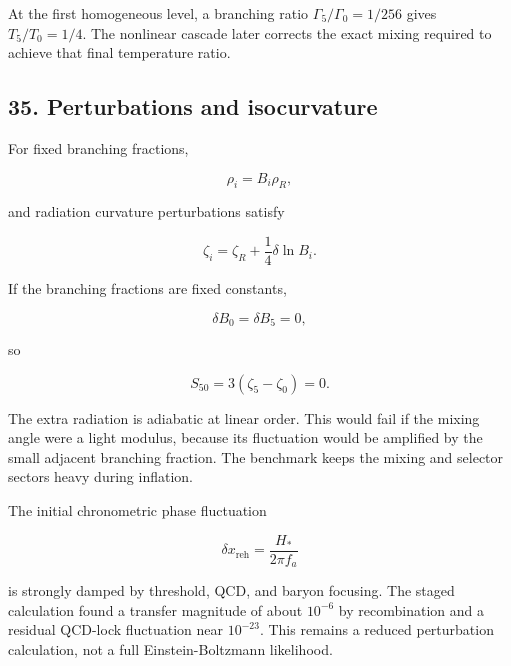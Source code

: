 \documentclass[
]{article}
\begin{document}
At the first homogeneous level, a branching ratio
\(\Gamma_5/\Gamma_0=1/256\) gives \(T_5/T_0=1/4\). The nonlinear cascade
later corrects the exact mixing required to achieve that final
temperature ratio.

\hypertarget{perturbations-and-isocurvature}{%
\subsection{35. Perturbations and
isocurvature}\label{perturbations-and-isocurvature}}

For fixed branching fractions,

\[
\rho_i=B_i\rho_R,
\]

and radiation curvature perturbations satisfy

\[
\zeta_i=\zeta_R+\frac14\delta\ln B_i.
\]

If the branching fractions are fixed constants,

\[
\delta B_0=\delta B_5=0,
\]

so

\[
S_{50}=3(\zeta_5-\zeta_0)=0.
\]

The extra radiation is adiabatic at linear order. This would fail if the
mixing angle were a light modulus, because its fluctuation would be
amplified by the small adjacent branching fraction. The benchmark keeps
the mixing and selector sectors heavy during inflation.

The initial chronometric phase fluctuation

\[
\delta x_{\mathrm{reh}}=\frac{H_*}{2\pi f_a}
\]

is strongly damped by threshold, QCD, and baryon focusing. The staged
calculation found a transfer magnitude of about \(10^{-6}\) by
recombination and a residual QCD-lock fluctuation near \(10^{-23}\).
This remains a reduced perturbation calculation, not a full
Einstein-Boltzmann likelihood.
\end{document}
